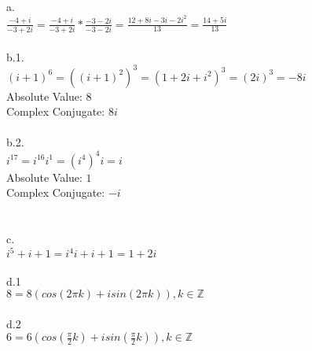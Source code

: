 \documentclass[11pt,leqno,fleqn]{article}
\begin{document}
\section{}
a. \\
$\frac{-4 + i}{-3 +2i} = \frac{-4 + i}{-3 +2i} * \frac{-3 - 2i}{-3 - 2i}  = \frac{12 + 8i -3i -2i^2}{13} = \frac{14 + 5i}{13}$\\
\\
b.1.\\
$(i+1)^6 = ((i+1)^2)^3 = (1 + 2i + i^2)^3 = (2i)^3 = -8i$\\
Absolute Value: $8$\\
Complex Conjugate: $8i$\\
\\
b.2.\\
$i^{17} = i^{16} i^1 = (i^4)^4i = i$\\
Absolute Value: $1$\\
Complex Conjugate: $-i$\\
\\
\\
c.\\
$i^5 + i + 1 = i^4 i + i + 1 = 1 + 2 i$\\
\\
d.1\\
$8 =  8( cos(2 \pi k) + isin(2 \pi k) ) , k \in \mathbb{Z}$\\
\\
d.2\\
$6 =  6( cos( \frac{\pi}{2}  k) + isin( \frac{\pi}{2} k) ) , k \in \mathbb{Z}$\\
\end{document}
